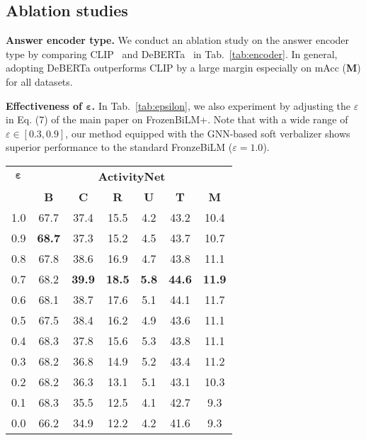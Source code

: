 \documentclass[10pt,twocolumn,letterpaper]{article}
\begin{document}
\subsection{Ablation studies}

\noindent \textbf{Answer encoder type.}
We conduct an ablation study on the answer encoder type by comparing CLIP~\cite{radford2021learning} and DeBERTa~\cite{he2020deberta} in Tab.~\ref{tab:encoder}.
In general, adopting DeBERTa outperforms CLIP by a large margin especially on mAcc (\textbf{M}) for all datasets.

\noindent \textbf{Effectiveness of $\boldsymbol{\varepsilon}$.}
In Tab.~\ref{tab:epsilon}, we also experiment by adjusting the $\varepsilon$ in Eq. (7) of the main paper on FrozenBiLM+.
Note that with a wide range of $\varepsilon \in [0.3, 0.9]$, our method equipped with the GNN-based soft verbalizer shows superior performance to the standard FronzeBiLM ($\varepsilon = 1.0$). \begin{table}[t!]
    \centering
    \setlength{\tabcolsep}{3.5pt}
    \begin{tabular}{c|c c c c c >{\columncolor{lightgray}}c}
        \toprule
        $\boldsymbol{\varepsilon}$ & \multicolumn{6}{c}{\textbf{ActivityNet}} \\
        & \textbf{B} & \textbf{C} & \textbf{R} & \textbf{U} & \textbf{T} & \textbf{M} \\
        \midrule
        \midrule
        1.0 & 67.7 & 37.4 & 15.5 & 4.2 & 43.2 & 10.4 \\
        0.9 & \textbf{68.7} & 37.3 & 15.2 & 4.5 & 43.7 & 10.7 \\
        0.8 & 67.8 & 38.6 & 16.9 & 4.7 & 43.8 & 11.1 \\
        0.7 & 68.2 & \textbf{39.9} & \textbf{18.5} & \textbf{5.8} & \textbf{44.6} & \textbf{11.9} \\
        0.6 & 68.1 & 38.7 & 17.6 & 5.1 & 44.1 & 11.7 \\
        0.5 & 67.5 & 38.4 & 16.2 & 4.9 & 43.6 & 11.1 \\
        0.4 & 68.3 & 37.8 & 15.6 & 5.3 & 43.8 & 11.1 \\
        0.3 & 68.2 & 36.8 & 14.9 & 5.2 & 43.4 & 11.2 \\
        0.2 & 68.2 & 36.3 & 13.1 & 5.1 & 43.1 & 10.3 \\
        0.1 & 68.3 & 35.5 & 12.5 & 4.1 & 42.7 & 9.3 \\
        0.0 & 66.2 & 34.9 & 12.2 & 4.2 & 41.6 & 9.3 \\
        \bottomrule

\end{tabular}
\end{table}
\end{document}
